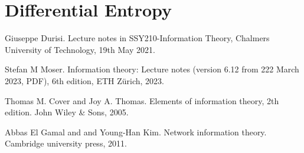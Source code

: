 \documentclass[11pt,a4paper]{article}
\begin{document}


\section{Differential Entropy}

% 
% 

\begin{thebibliography}{9}
    Giuseppe Durisi. Lecture notes in SSY210-Information Theory, Chalmers University of Technology, 19th May 2021.

    Stefan M Moser. Information theory: Lecture notes (version 6.12 from 222 March 2023, PDF), 6th edition, ETH Z{ü}rich, 2023.

    Thomas M. Cover and Joy A. Thomas. Elements of information theory, 2th edition. John Wiley \& Sons, 2005.

    Abbas El Gamal and and Young-Han Kim. Network information theory. Cambridge university press, 2011.

        
\end{thebibliography}
        
    
\end{document}
